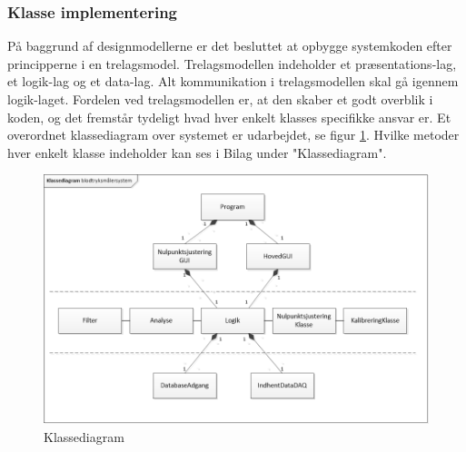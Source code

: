 \subsubsection{Klasse implementering}
På baggrund af designmodellerne er det besluttet at opbygge systemkoden efter principperne i en trelagsmodel\cite{3lagsmodel}. Trelagsmodellen indeholder et præsentations-lag, et logik-lag og et data-lag. Alt kommunikation i trelagsmodellen skal gå igennem logik-laget. Fordelen ved trelagsmodellen er, at den skaber et godt overblik i koden, og det fremstår tydeligt hvad hver enkelt klasses specifikke ansvar er. Et overordnet klassediagram over systemet er udarbejdet, se figur \ref{fig:KlassediagramSW}. Hvilke metoder hver enkelt klasse indeholder kan ses i Bilag under "Klassediagram". 
\begin{figure}[H]
	\centering
	\includegraphics[width=1.0\textwidth]{Figurer/Klassediagram}
	\caption{Klassediagram}
	\label{fig:KlassediagramSW}
\end{figure}

